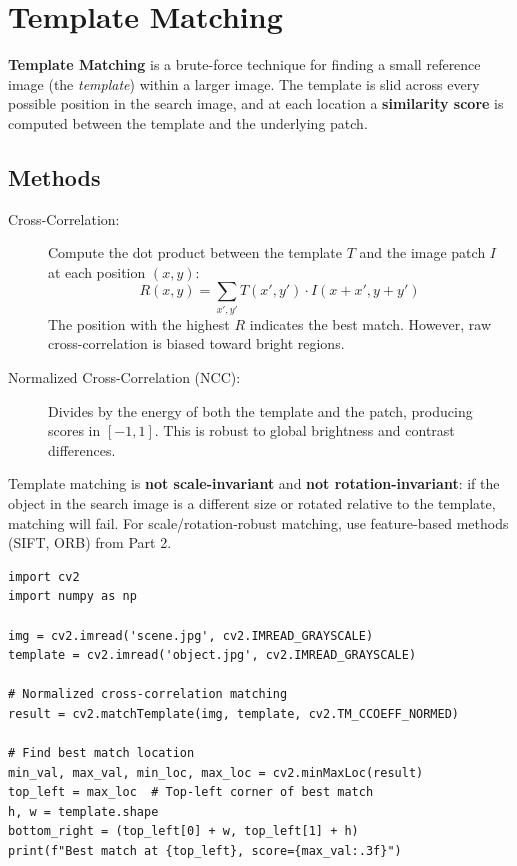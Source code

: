 \section*{Template Matching}

\textbf{Template Matching} is a brute-force technique for finding a small reference image (the \textit{template}) within a larger image. The template is slid across every possible position in the search image, and at each location a \textbf{similarity score} is computed between the template and the underlying patch.

\subsection*{Methods}

\begin{description}
    \item[Cross-Correlation:] Compute the dot product between the template $T$ and the image patch $I$ at each position $(x, y)$:
    $$ R(x, y) = \sum_{x', y'} T(x', y') \cdot I(x + x', y + y') $$
    The position with the highest $R$ indicates the best match. However, raw cross-correlation is biased toward bright regions.
    \item[Normalized Cross-Correlation (NCC):] Divides by the energy of both the template and the patch, producing scores in $[-1, 1]$. This is robust to global brightness and contrast differences.
\end{description}

\begin{remark}[Limitations]
Template matching is \textbf{not scale-invariant} and \textbf{not rotation-invariant}: if the object in the search image is a different size or rotated relative to the template, matching will fail. For scale/rotation-robust matching, use feature-based methods (SIFT, ORB) from Part 2.
\end{remark}

\begin{lstlisting}[style=pythonstyle]
import cv2
import numpy as np

img = cv2.imread('scene.jpg', cv2.IMREAD_GRAYSCALE)
template = cv2.imread('object.jpg', cv2.IMREAD_GRAYSCALE)

# Normalized cross-correlation matching
result = cv2.matchTemplate(img, template, cv2.TM_CCOEFF_NORMED)

# Find best match location
min_val, max_val, min_loc, max_loc = cv2.minMaxLoc(result)
top_left = max_loc  # Top-left corner of best match
h, w = template.shape
bottom_right = (top_left[0] + w, top_left[1] + h)
print(f"Best match at {top_left}, score={max_val:.3f}")
\end{lstlisting}

